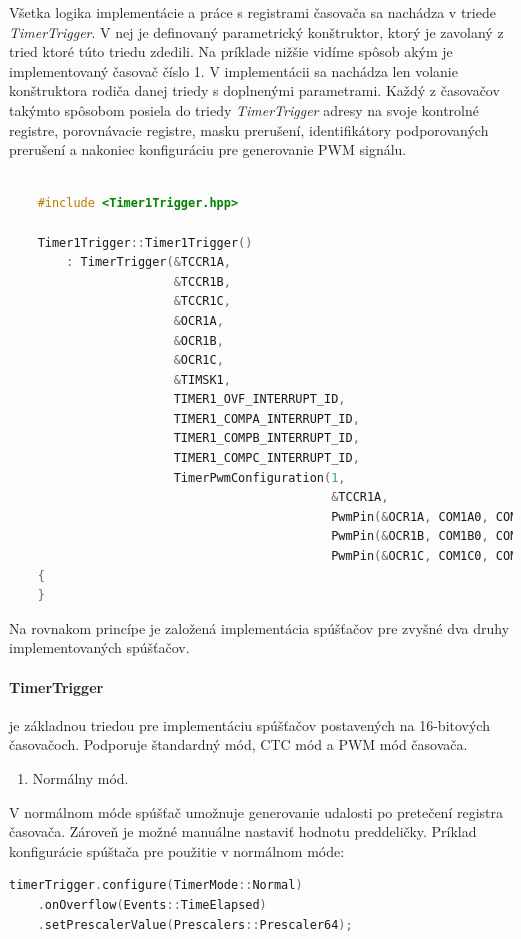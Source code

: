 Všetka logika implementácie a práce s registrami časovača sa nachádza v triede \textit{TimerTrigger}. V nej je definovaný parametrický konštruktor, ktorý
je zavolaný z tried ktoré túto triedu zdedili. Na príklade nižšie vidíme spôsob akým je implementovaný časovač číslo 1. V implementácii sa nachádza len volanie
konštruktora rodiča danej triedy s doplnenými parametrami. Každý z časovačov takýmto spôsobom posiela do triedy \textit{TimerTrigger} adresy na svoje
kontrolné registre, porovnávacie registre, masku prerušení, identifikátory podporovaných prerušení a nakoniec konfiguráciu pre generovanie PWM signálu.

\begin{lstlisting}[language=c++]  

    #include <Timer1Trigger.hpp>

    Timer1Trigger::Timer1Trigger()
        : TimerTrigger(&TCCR1A,
                       &TCCR1B,
                       &TCCR1C,
                       &OCR1A,
                       &OCR1B,
                       &OCR1C,
                       &TIMSK1,
                       TIMER1_OVF_INTERRUPT_ID,
                       TIMER1_COMPA_INTERRUPT_ID,
                       TIMER1_COMPB_INTERRUPT_ID,
                       TIMER1_COMPC_INTERRUPT_ID,
                       TimerPwmConfiguration(1,
                                             &TCCR1A,
                                             PwmPin(&OCR1A, COM1A0, COM1A1),
                                             PwmPin(&OCR1B, COM1B0, COM1B1),
                                             PwmPin(&OCR1C, COM1C0, COM1C1)))
    {
    }
\end{lstlisting}

Na rovnakom princípe je založená implementácia spúšťačov pre zvyšné dva druhy implementovaných spúšťačov. \par

\paragraph*{TimerTrigger} \: je základnou triedou pre implementáciu spúšťačov postavených na 16-bitových časovačoch. Podporuje štandardný mód, CTC mód a PWM mód časovača.

\begin{enumerate}
    \item Normálny mód.
\end{enumerate}

V normálnom móde spúšťač umožnuje generovanie udalosti po pretečení registra časovača. Zároveň je možné manuálne nastaviť hodnotu preddeličky.
Príklad konfigurácie spúštača pre použitie v normálnom móde:
\begin{lstlisting}[language=c++]      
timerTrigger.configure(TimerMode::Normal)
    .onOverflow(Events::TimeElapsed)
    .setPrescalerValue(Prescalers::Prescaler64);
\end{lstlisting}


